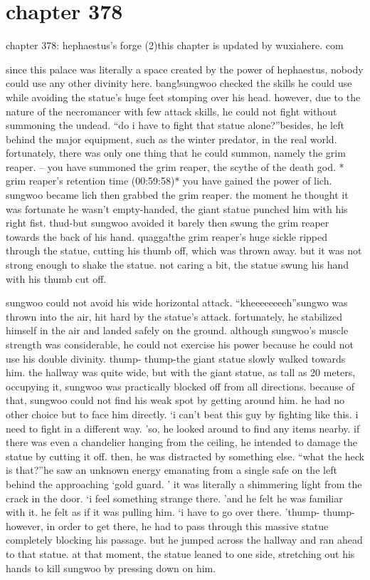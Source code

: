 \section{chapter 378}

chapter 378: hephaestus’s forge (2)this chapter is updated by wuxiahere.
com




since this palace was literally a space created by the power of hephaestus, nobody could use any other divinity here.
bang!sungwoo checked the skills he could use while avoiding the statue’s huge feet stomping over his head.
 however, due to the nature of the necromancer with few attack skills, he could not fight without summoning the undead.
“do i have to fight that statue alone?”besides, he left behind the major equipment, such as the winter predator, in the real world.
fortunately, there was only one thing that he could summon, namely the grim reaper.
– you have summoned the grim reaper, the scythe of the death god.
* grim reaper’s retention time (00:59:58)* you have gained the power of lich.
sungwoo became lich then grabbed the grim reaper.
 the moment he thought it was fortunate he wasn’t empty-handed, the giant statue punched him with his right fist.
thud-but sungwoo avoided it barely then swung the grim reaper towards the back of his hand.
quagga!the grim reaper’s huge sickle ripped through the statue, cutting his thumb off, which was thrown away.
 but it was not strong enough to shake the statue.
not caring a bit, the statue swung his hand with his thumb cut off.

sungwoo could not avoid his wide horizontal attack.
“kheeeeeeeeh”sungwo was thrown into the air, hit hard by the statue’s attack.
 fortunately, he stabilized himself in the air and landed safely on the ground.
although sungwoo’s muscle strength was considerable, he could not exercise his power because he could not use his double divinity.
thump- thump-the giant statue slowly walked towards him.
 the hallway was quite wide, but with the giant statue, as tall as 20 meters, occupying it, sungwoo was practically blocked off from all directions.
 because of that, sungwoo could not find his weak spot by getting around him.
 he had no other choice but to face him directly.
‘i can’t beat this guy by fighting like this.
 i need to fight in a different way.
’so, he looked around to find any items nearby.
 if there was even a chandelier hanging from the ceiling, he intended to damage the statue by cutting it off.
then, he was distracted by something else.
“what the heck is that?”he saw an unknown energy emanating from a single safe on the left behind the approaching ‘gold guard.
’ it was literally a shimmering light from the crack in the door.
‘i feel something strange there.
’and he felt he was familiar with it.
 he felt as if it was pulling him.
‘i have to go over there.
’thump- thump-however, in order to get there, he had to pass through this massive statue completely blocking his passage.
 but he jumped across the hallway and ran ahead to that statue.
 at that moment, the statue leaned to one side, stretching out his hands to kill sungwoo by pressing down on him.

